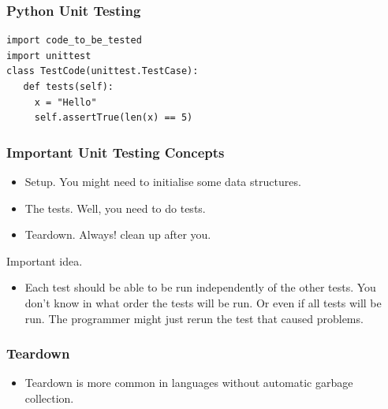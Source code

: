 \documentclass{beamer}
\begin{document}
\begin{frame}[fragile]
  \frametitle{Python Unit Testing}
\begin{lstlisting}
import code_to_be_tested
import unittest
class TestCode(unittest.TestCase):
   def tests(self):
     x = "Hello"
     self.assertTrue(len(x) == 5)
\end{lstlisting}
\end{frame} 
\begin{frame}
  \frametitle{Important Unit Testing Concepts}
  \begin{itemize}
  \item Setup. You might need to initialise some data structures.  \pause
  \item The tests. Well, you need to do tests. \pause
  \item Teardown. Always! clean up after you. \pause
  \end{itemize}
Important idea.
\begin{itemize}
\item Each test should be able to be run independently of the other
  tests. You don't know in what order the tests will be run. Or even if
  all tests will be run. The programmer might just rerun the test that
  caused problems. 
\end{itemize}
\end{frame}
\begin{frame}
  \frametitle{Teardown}
  \begin{itemize}
  \item Teardown is more common in languages without automatic garbage
    collection. 
  \end{itemize}
\end{frame}
\end{document}
